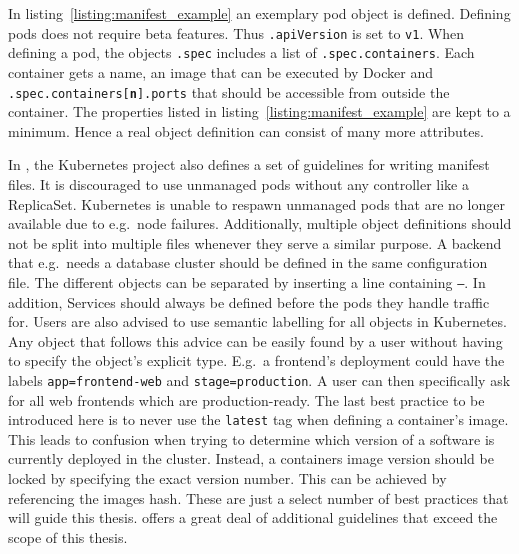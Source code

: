 In listing~\ref{listing:manifest_example} an exemplary pod object is defined.
Defining pods does not require beta features. Thus \texttt{.apiVersion} is set
to \texttt{v1}. When defining a pod, the objects \texttt{.spec} includes a list
of \texttt{.spec.containers}. Each container gets a name, an image that can be
executed by Docker and \texttt{.spec.containers[\textbf{n}].ports} that should
be accessible from outside the container. The properties listed in
listing~\ref{listing:manifest_example} are kept to a minimum. Hence a real
object definition can consist of many more attributes.

In \autocite{AuthorsConfigurationBestPractices2019}, the Kubernetes project
also defines a set of guidelines for writing manifest files. It is discouraged
to use unmanaged pods without any controller like a ReplicaSet. Kubernetes is
unable to respawn unmanaged pods that are no longer available due to e.g.\ node
failures. Additionally, multiple object definitions should not be split into
multiple files whenever they serve a similar purpose. A backend that e.g.\
needs a database cluster should be defined in the same configuration file. The
different objects can be separated by inserting a line containing \texttt{---}.
In addition, Services should always be defined before the pods they handle
traffic for. Users are also advised to use semantic labelling for all objects
in Kubernetes. Any object that follows this advice can be easily found by a
user without having to specify the object's explicit type. E.g.\ a frontend's
deployment could have the labels \texttt{app=frontend-web} and
\texttt{stage=production}. A user can then specifically ask for all web
frontends which are production-ready. The last best practice to be introduced
here is to never use the \texttt{latest} tag when defining a container's image.
This leads to confusion when trying to determine which version of a software is
currently deployed in the cluster. Instead, a containers image version should
be locked by specifying the exact version number. This can be achieved by
referencing the images hash. These are just a select number of best practices
that will guide this thesis. \autocite{AuthorsConfigurationBestPractices2019}
offers a great deal of additional guidelines that exceed the scope of this
thesis.

